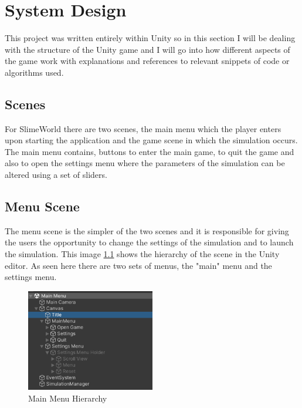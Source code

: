 \chapter{System Design}
This project was written entirely within Unity so in this section I will be dealing with the structure of the Unity game and I will go into how different aspects of the game work with explanations and references to relevant snippets of code or algorithms used.
\section{Scenes}
For SlimeWorld there are two scenes, the main menu which the player enters upon starting the application and the game scene in which the simulation occurs. The main menu contains, buttons to enter the main game, to quit the game and also to open the settings menu where the parameters of the simulation can be altered using a set of sliders.
\section{Menu Scene}
The menu scene is the simpler of the two scenes and it is responsible for giving the users the opportunity to change the settings of the simulation and to launch the simulation.  This image \ref{image:mainMenuHierarchy} shows the hierarchy of the scene in the Unity editor. As seen here there are two sets of menus, the "main" menu and the settings menu.
\begin{figure}[ht!]
    \includegraphics[width=0.5\textwidth]{images/MainMenuHierarchy.png}
    \caption{Main Menu Hierarchy}
    \label{image:mainMenuHierarchy}
\end{figure}

